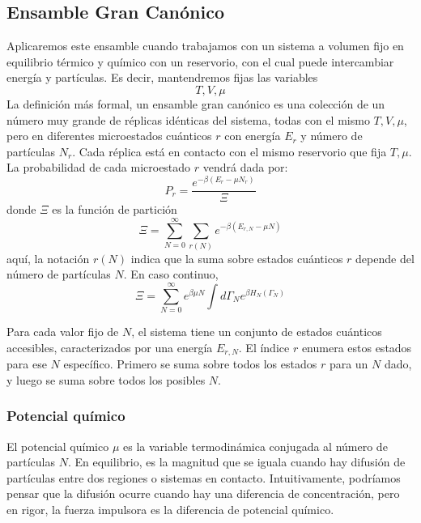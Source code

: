 \documentclass[]{article}
\numberwithin{equation}{section}
\newcommand{\0}{\textcolor{gray}{0}}
\begin{document}
\subsection{Ensamble Gran Canónico}
Aplicaremos este ensamble cuando trabajamos con un sistema a volumen fijo en equilibrio térmico y químico con un reservorio, con el cual puede intercambiar energía y partículas. Es decir, mantendremos fijas las variables
\begin{equation*}
	T, V, \mu
\end{equation*}
La definición más formal, un ensamble gran canónico es una colección de un número muy grande de réplicas idénticas del sistema, todas con el mismo \(T, V, \mu\), pero en diferentes microestados cuánticos \(r\) con energía \(E_r\) y número de partículas \(N_r\). Cada réplica está en contacto con el mismo reservorio que fija \(T, \mu\). La probabilidad de cada microestado \(r\) vendrá dada por:
\begin{equation}
	P_r = \frac{e^{- \beta\left(E_{r} - \mu N_r\right)}}{\Xi}
\end{equation}
donde \(\Xi\) es la función de partición
\begin{equation}
	\Xi = \sum_{N=0}^{\infty} \sum_{r(N)} e^{-\beta\left( E_{r,N} - \mu N\right)}
\end{equation}
aquí, la notación \(r(N)\) indica que la suma sobre estados cuánticos \(r\) depende del número de partículas \(N\). En caso continuo,
\begin{equation}
	\Xi = \sum_{N=0}^{\infty} e^{\beta \mu N} \int d\Gamma_N e^{\beta H_N(\Gamma_N)}
\end{equation}

Para cada valor fijo de \(N \), el sistema tiene un conjunto de estados cuánticos accesibles, caracterizados por una energía \(E_{r,N} \). El índice \(r\) enumera estos estados para ese \(N\) específico. Primero se suma sobre todos los estados \(r\) para un \(N\) dado, y luego se suma sobre todos los posibles \(N \).

\subsubsection{Potencial químico}
El potencial químico \(\mu\) es la variable termodinámica conjugada al número de partículas \(N \). En equilibrio, es la magnitud que se iguala cuando hay difusión de partículas entre dos regiones o sistemas en contacto. Intuitivamente, podríamos pensar que la difusión ocurre cuando hay una diferencia de concentración, pero en rigor, la fuerza impulsora es la diferencia de potencial químico.
\end{document}
